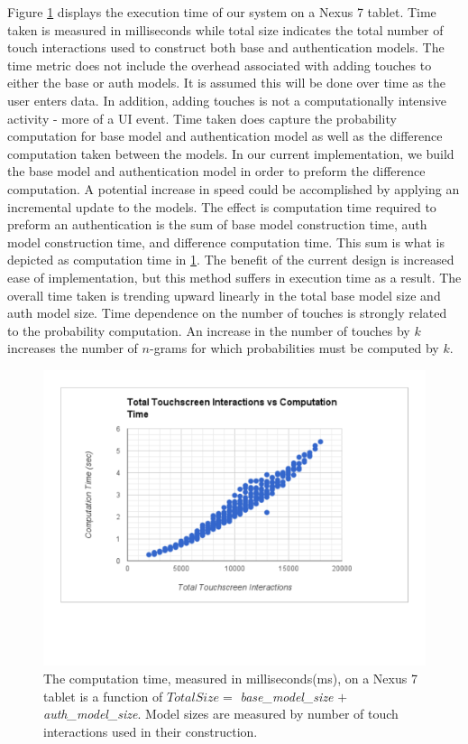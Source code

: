 \documentclass{acm_proc_article-sp}
\begin{document}
Figure \ref{fig:nexus_total_size_time} displays
the execution time of our system on a Nexus 7 tablet.
Time taken is measured in milliseconds while 
total size indicates the total number of touch interactions used 
to construct both base and authentication models. 
%
The time metric does not include the overhead associated with adding touches to either the base or auth models. 
It is assumed this will be done over time as the user enters data.
In addition, adding touches is not a computationally intensive activity - more of a UI event. 
Time taken does capture 
the probability computation 
for base model and authentication model 
as well as the difference computation taken between the models.
%
In our current implementation,
we build the base model and authentication model in order to preform
the difference computation.
A potential increase in speed could be accomplished
by applying an incremental update to the models.
%
The effect is computation time required to preform an authentication is the sum of
base model construction time, 
auth model construction time, and
difference computation time.
This sum is what is depicted as computation time in \ref{fig:nexus_total_size_time}.
%
The benefit of the current design is increased ease of implementation, 
but this method suffers in execution time as a result.
%
The overall time taken is trending upward linearly in the total base model size and auth model size.
Time dependence on the number of touches is strongly related to
the probability computation.
An increase in the number of touches by $k$
increases the number of $n$-grams 
for which probabilities must be computed 
by $k$.

\begin{figure}
\centering
\includegraphics[width=.45\textwidth]{nexus_7_runtimes.pdf}
\caption{
The computation time, measured in milliseconds(ms), on a Nexus 7 tablet is
a function of
$Total Size =$ {\it base\_model\_size} $+$ {\it auth\_model\_size}.
Model sizes are measured by number of touch interactions used in their construction.
}
\label{fig:nexus_total_size_time}
\end{figure}
\end{document}
